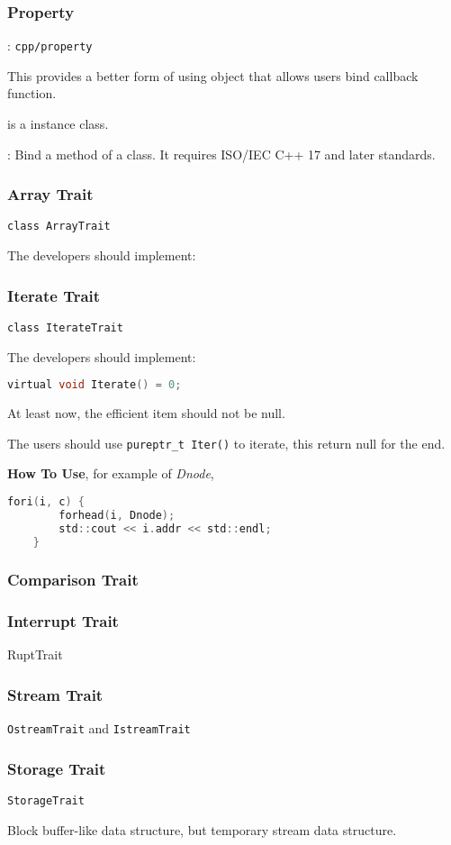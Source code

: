 
\subsubsection{Property}
: \verb`cpp/property`

This provides a better form of using object that allows users bind callback function.

 is a instance class.

: Bind a method of a class. It requires ISO/IEC C++ 17 and later standards.



\subsubsection{Array Trait}

\verb|class ArrayTrait|

The developers should implement:

\lstset{style=GlobalCxx}

\subsubsection{Iterate Trait}

\verb|class IterateTrait|

The developers should implement:

\lstset{style=GlobalC}
\begin{lstlisting}[language=C]
	virtual void Iterate() = 0;
\end{lstlisting}

At least now, the efficient item should not be null.

The users should use \verb|pureptr_t Iter()| to iterate, this return null for the end.

\textbf{How To Use}, for example of \textit{Dnode},

\lstset{style=GlobalC}
\begin{lstlisting}[language=C]
	fori(i, c) {
		forhead(i, Dnode);
		std::cout << i.addr << std::endl;
	}
\end{lstlisting}

\subsubsection{Comparison Trait}

\subsubsection{Interrupt Trait}

RuptTrait


\subsubsection{Stream Trait}

\verb`OstreamTrait` and \verb`IstreamTrait`

\subsubsection{Storage Trait}

\verb`StorageTrait`

Block buffer-like data structure, but temporary stream data structure.
